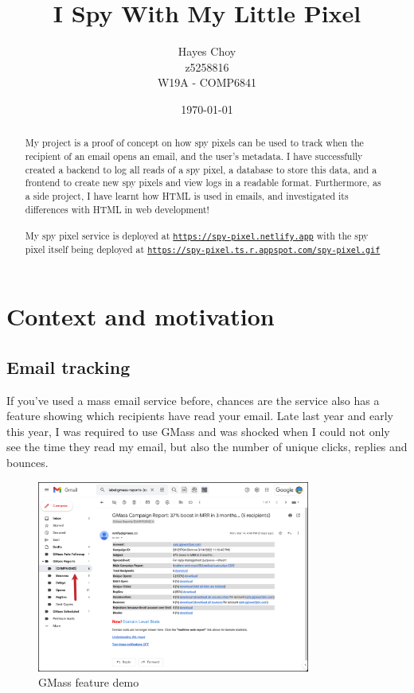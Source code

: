 \documentclass{article}
\title{I Spy With My Little Pixel}
\author{Hayes Choy\\z5258816\\W19A - COMP6841}
\date{\today}
\begin{document}
\maketitle

\begin{abstract} 
\noindent My project is a proof of concept on how spy pixels can be used to track when the recipient of an email opens an email, and the user’s metadata. I have successfully created a backend to log all reads of a spy pixel, a database to store this data, and a frontend to create new spy pixels and view logs in a readable format. Furthermore, as a side project, I have learnt how HTML is used in emails, and investigated its differences with HTML in web development!
\\
\\
My spy pixel service is deployed at \href{https://spy-pixel.netlify.app}{\texttt{https://spy-pixel.netlify.app}} with the spy pixel itself being deployed at \href{https://spy-pixel.ts.r.appspot.com/spy-pixel.gif}{\texttt{https://spy-pixel.ts.r.appspot.com/spy-pixel.gif}}

\end{abstract}

\section{\label{context}Context and motivation}

\subsection{Email tracking}

If you've used a mass email service before, chances are the service also has a feature showing which recipients have read your email. Late last year and early this year, I was required to use GMass and was shocked when I could not only see the time they read my email, but also the number of unique clicks, replies and bounces.

\begin{figure}[H]
\centering
\includegraphics[width=0.8\textwidth]{images/gmass.png}
\caption{\label{fig1}GMass feature demo}
\end{figure}
\end{document}
